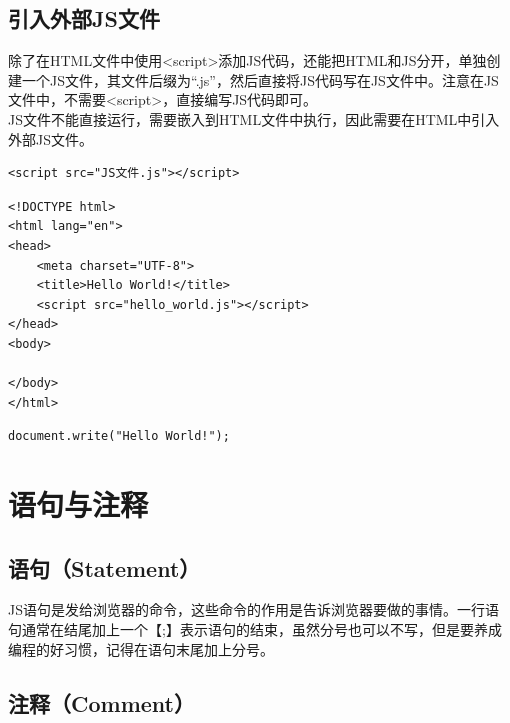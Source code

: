 \subsection{引入外部JS文件}

除了在HTML文件中使用<script>添加JS代码，还能把HTML和JS分开，单独创建一个JS文件，其文件后缀为“.js”，然后直接将JS代码写在JS文件中。注意在JS文件中，不需要<script>，直接编写JS代码即可。 \\

JS文件不能直接运行，需要嵌入到HTML文件中执行，因此需要在HTML中引入外部JS文件。 \\

\begin{lstlisting}[style=htmlcssjs]
<script src="JS文件.js"></script>
\end{lstlisting}

\vspace{0.5cm}


\begin{lstlisting}[style=htmlcssjs, title=hello\_world.html]
<!DOCTYPE html>
<html lang="en">
<head>
    <meta charset="UTF-8">
    <title>Hello World!</title>
    <script src="hello_world.js"></script>
</head>
<body>

</body>
</html>
\end{lstlisting}

\begin{lstlisting}[style=htmlcssjs, title=hello\_world.js]
document.write("Hello World!");
\end{lstlisting}

\newpage

\section{语句与注释}

\subsection{语句（Statement）}

JS语句是发给浏览器的命令，这些命令的作用是告诉浏览器要做的事情。一行语句通常在结尾加上一个【;】表示语句的结束，虽然分号也可以不写，但是要养成编程的好习惯，记得在语句末尾加上分号。

\subsection{注释（Comment）}


